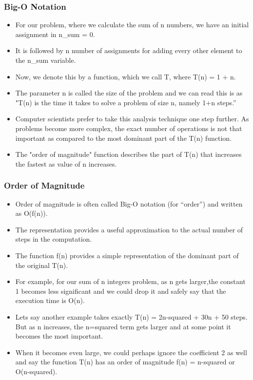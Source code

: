 \documentclass{beamer}
\begin{document}
\begin{frame}
\frametitle{Big-O Notation}
\begin{itemize}
\item For our problem, where we calculate the sum of n numbers, we have an initial assignment in n\_sum = 0.
\item It is followed by n number of assignments for adding every other element to the n\_sum variable.
\item Now, we denote this by a function, which we call T, where T(n) = 1 + n.
\item The parameter n is called the size of the problem and we can read this is as "T(n) is the time it takes to solve a problem of size n, namely 1+n steps.”
\item Computer scientists prefer to take this analysis technique one step further. As problems become more complex, the exact number of operations is not that important as compared to the most dominant part of the T(n) function.
\item The "order of magnitude" function describes the part of T(n) that increases the fastest as value of n increases. 
\end{itemize}
\end{frame}

\begin{frame}
\frametitle{Order of Magnitude}
\begin{itemize}
\item Order of magnitude is often called Big-O notation (for “order”) and written as
O(f(n)).
\item The representation provides a useful approximation to the actual number of steps in the computation.
\item The function f(n) provides a simple representation of the dominant part of the original T(n).
\item For example, for our sum of n integers problem, as n gets larger,the constant 1 becomes less significant and we could drop it and safely say that the execution time is O(n).
\item Lets say another example takes exactly T(n) = 2n-squared + 30n + 50 steps. But as n increases, the n=squared term gets larger and at some point it becomes the most important.
\item When it becomes even large, we could perhaps ignore the coefficient 2 as well and say the function T(n) has an order of magnitude f(n) = n-squared or O(n-squared). 
\end{itemize}
\end{frame}
\end{document}
